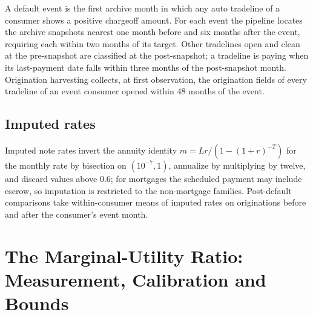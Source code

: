 \documentclass[12pt,english]{article}
\begin{document}
A default event is the first archive month in which any auto tradeline of a consumer shows a positive chargeoff amount. For each event the pipeline locates the archive snapshots nearest one month before and six months after the event, requiring each within two months of its target. Other tradelines open and clean at the pre-snapshot are classified at the post-snapshot; a tradeline is paying when its last-payment date falls within three months of the post-snapshot month. Origination harvesting collects, at first observation, the origination fields of every tradeline of an event consumer opened within 48 months of the event.

\subsection{Imputed rates}

Imputed note rates invert the annuity identity $m = L r / (1 - (1+r)^{-T})$ for the monthly rate by bisection on $(10^{-7}, 1)$, annualize by multiplying by twelve, and discard values above 0.6; for mortgages the scheduled payment may include escrow, so imputation is restricted to the non-mortgage families. Post-default comparisons take within-consumer means of imputed rates on originations before and after the consumer's event month.

\section{The Marginal-Utility Ratio: Measurement, Calibration and Bounds}\label{appendix:mucorrection}
\end{document}
